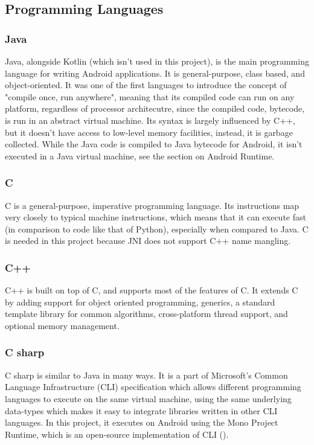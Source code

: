     \subsection{Programming Languages}
        \subsubsection{Java}
        Java, alongside Kotlin (which isn't used in this project), is the main programming language for writing Android applications. It is general-purpose, class based, and object-oriented. It was one of the first languages to introduce the concept of "compile once, run anywhere", meaning that its compiled code can run on any platform, regardless of processor architecutre, since the compiled code, bytecode, is run in an abstract virtual machine. Its syntax is largely influenced by C++, but it doesn't have access to low-level memory facilities, instead, it is garbage collected. While the Java code is compiled to Java bytecode for Android, it isn't executed in a Java virtual machine, see the section on Android Runtime.
        \subsubsection{C}
        C is a general-purpose, imperative programming language. Its instructions map very closely to typical machine instructions, which means that it can execute fast (in comparison to code like that of Python), especially when compared to Java. C is needed in this project because JNI does not support C++ name mangling.
        \subsubsection{C++}
        C++ is built on top of C, and supports most of the features of C. It extends C by adding support for object oriented programming, generics, a standard template library for common algorithms, cross-platform thread support, and optional memory management.
        \subsubsection{C sharp}
        C sharp is similar to Java in many ways. It is a part of Microsoft's Common Language Infrastructure (CLI) specification which allows different programming languages to execute on the same virtual machine, using the same underlying data-types which makes it easy to integrate libraries written in other CLI languages. In this project, it executes on Android using the Mono Project Runtime, which is an open-source implementation of CLI (\cite{monoproject}).

